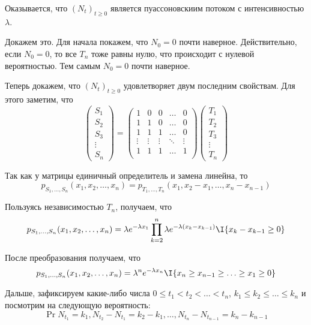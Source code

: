 Оказывается, что \((N_{t})_{t \geq 0}\) является пуассоновскиим потоком с 
интенсивностью \(\lambda\).
\begin{leftbar}
\begin{small}\noindent
	Докажем это. Для начала покажем, что \(N_{0} = 0\) почти наверное. 
	Действительно, если \(N_{0} = 0\), то все \(T_{n}\) тоже равны нулю, что 
	происходит с нулевой вероятностью. Тем самым \(N_{0} = 0\) почти 
	наверное.
	
	Теперь докажем, что \((N_{t})_{t \geq 0}\) удовлетворяет двум последним 
	свойствам. Для этого заметим, что
	\[
		\begin{pmatrix}
		S_{1} \\ S_{2} \\ S_{3} \\ \vdots \\ S_{n} 
		\end{pmatrix}
		=
		\begin{pmatrix}
		1 & 0 & 0 & \ldots & 0 \\
		1 & 1 & 0 & \ldots & 0 \\
		1 & 1 & 1 & \ldots & 0 \\
		\vdots & \vdots & \vdots & \ddots & \vdots \\
		1 & 1 & 1 & \ldots & 1 \\
		\end{pmatrix}
		\begin{pmatrix}
		T_{1} \\ T_{2} \\ T_{3} \\ \vdots \\ T_{n} 
		\end{pmatrix}
	\]
	
	Так как у матрицы единичный определитель и замена линейна, то
	\[
		p_{S_{1}, \dots, S_{n}}(x_{1}, x_{2}, \dots, x_{n}) = p_{T_{1}, \dots, 
		T_{n}}(x_{1}, x_{2} - x_{1}, \dots, x_{n} - x_{n - 1})
	\]
	
	Пользуясь независимостью \(T_{n}\), получаем, что
	\[
		p_{S_{1}, \dots, S_{n}}(x_{1}, x_{2}, \dots, x_{n}) = \lambda 
		e^{-\lambda x_{1}}\prod_{k = 2}^{n}\lambda e^{-\lambda(x_{k} - x_{k - 
		1})}\I\{x_{k} - x_{k - 1} \geq 0\}
	\]
	
	После преобразования получаем, что
	\[
		p_{S_{1}, \dots, S_{n}}(x_{1}, x_{2}, \dots, x_{n}) = 
		\lambda^{n}e^{-\lambda x_{n}}\I\{x_{n} \geq x_{n - 1} \geq \ldots \geq 
		x_{1} \geq 0\}
	\]
	
	Дальше, зафиксируем какие-либо числа \(0 \leq t_{1} < t_{2} < \dots < 
	t_{n}\), \(k_{1} \leq k_{2} \leq \dots \leq k_{n}\) и посмотрим на 
	следующую вероятность:
	\[
		\Pr{N_{t_{1}} = k_{1}, N_{t_{2}} - N_{t_{1}} = k_{2} - k_{1}, \dots, 
		N_{t_{n}} - N_{t_{n - 1}} = k_{n} -  k_{n - 1}}
	\]
	

\end{small}
\end{leftbar}
